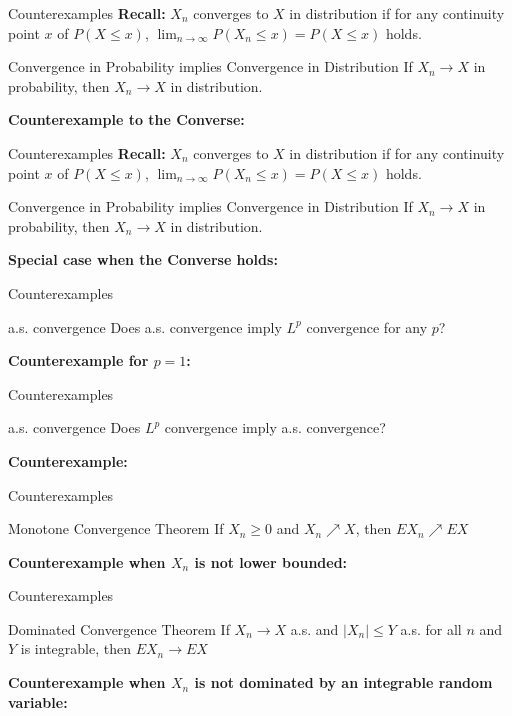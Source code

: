 \documentclass [aspectratio=169]{beamer}
\begin{document}
\begin{frame}{Counterexamples}
    \textbf{Recall:} $X_n$ converges to $X$ in distribution if for any continuity point $x$ of $P(X\leq x)$, $\lim_{n\to \infty}P(X_n \leq x) = P(X\leq x)$ holds.\\
    \begin{block}{Convergence in Probability implies Convergence in Distribution}
    If $X_n \to X$ in probability, then $X_n \to X$ in distribution. 
    \end{block}
    \textbf{Counterexample to the Converse: }
    \vspace{1.8in}
\end{frame}

\begin{frame}{Counterexamples}
    \textbf{Recall:} $X_n$ converges to $X$ in distribution if for any continuity point $x$ of $P(X\leq x)$, $\lim_{n\to \infty}P(X_n \leq x) = P(X\leq x)$ holds.\\
    \begin{block}{Convergence in Probability implies Convergence in Distribution}
    If $X_n \to X$ in probability, then $X_n \to X$ in distribution. 
    \end{block}
    \textbf{Special case when the Converse holds: }
    \vspace{1.8in}
\end{frame}

\begin{frame}{Counterexamples}
    \begin{block}{a.s. convergence}
    Does a.s. convergence imply $L^p$ convergence for any $p$?
    \end{block}
    \textbf{Counterexample for $p=1$: }
    \vspace{1.8in}
\end{frame}

\begin{frame}{Counterexamples}
    \begin{block}{a.s. convergence}
    Does $L^p$ convergence imply a.s. convergence?
    \end{block}
    \textbf{Counterexample: }
    \vspace{1.8in}
\end{frame}


\begin{frame}{Counterexamples}
    \begin{block}{Monotone Convergence Theorem}
    If $X_n \geq 0$ and $X_n \nearrow X$, then $EX_n \nearrow EX$ 
    \end{block}
    \textbf{Counterexample when $X_n$ is not lower bounded: }
    \vspace{1.8in}
\end{frame}


\begin{frame}{Counterexamples}
    \begin{block}{Dominated Convergence Theorem}
    If $X_n \to X$ a.s. and $|X_n| \leq Y$ a.s. for all $n$ and $Y$ is integrable, then $EX_n \to EX$ 
    \end{block}
    \textbf{Counterexample when $X_n$ is not dominated by an integrable random variable: }
    \vspace{1.8in}
\end{frame}
\end{document}
